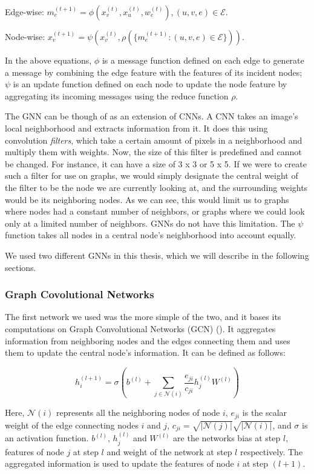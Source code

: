 \documentclass[times, utf8, diplomski, english]{fer_eng}
\begin{document}
Edge-wise: $m_e^{(t+1)} = \phi (x_v^{(t)}, x_u^{(t)}, w_e^{(t)}), (u, v, e) \in \mathcal{E}$.

Node-wise: $x_v^{(t+1)} = \psi (x_v^{(t)}, \rho (\{m_e^{(t+1)}: (u, v, e) \in \mathcal{E}\}))$.

In the above equations, $\phi$ is a message function defined on each edge to generate a message by combining the edge feature with the features of its incident nodes; $\psi$ is an update function defined on each node to update the node feature by aggregating its incoming messages using the reduce function $\rho$.

The GNN can be though of as an extension of CNNs. A CNN takes an image's local neighborhood and extracts information from it. It does this using convolution \textit{filters}, which take a certain amount of pixels in a neighborhood and multiply them with weights. Now, the size of this filter is predefined and cannot be changed. For instance, it can have a size of 3 x 3 or 5 x 5. If we were to create such a filter for use on graphs, we would simply designate the central weight of the filter to be the node we are currently looking at, and the surrounding weights would be its neighboring nodes. As we can see, this would limit us to graphs where nodes had a constant number of neighbors, or graphs where we could look only at a limited number of neighbors. GNNs do not have this limitation. The $\psi$ function takes all nodes in a central node's neighborhood into account equally.

We used two different GNNs in this thesis, which we will describe in the following sections.

\subsubsection{Graph Covolutional Networks}

The first network we used was the more simple of the two, and it bases its computations on Graph Convolutional Networks (GCN) (\cite{GCN}). It aggregates information from neighboring nodes and the edges connecting them and uses them to update the central node's information. It can be defined as follows:

\[ h_i^{(l+1)} = \sigma (b^{(l)} + \sum_{j \in \mathcal{N}(i)} \frac{e_{ji}}{c_{ji}} h_j^{(l)} W^{(l)} ) \]

Here, $\mathcal{N}(i)$ represents all the neighboring nodes of node $i$, $e_{ji}$ is the scalar weight of the edge connecting nodes $i$ and $j$, $c_{ji} = \sqrt{|\mathcal{N}(j)|} \sqrt{|\mathcal{N}(i)|}$, and $\sigma$ is an activation function. $b^{(l)}$, $h_j^{(l)}$ and $W^{(l)}$ are the networks bias at step $l$, features of node $j$ at step $l$ and weight of the network at step $l$ respectively. The aggregated information is used to update the features of node $i$ at step $(l+1)$.
\end{document}
